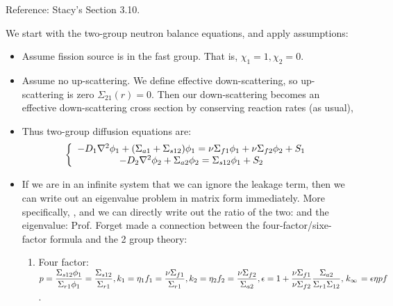 \documentclass{school-22.211-notes}
\date{April 4, 2012}
\begin{document}
\maketitle

\label{2g-finite-difference}
Reference: Stacy's Section 3.10. 

We start with the two-group neutron balance equations, and apply assumptions:
\begin{itemize}
\item Assume fission source is in the fast group. That is, $\chi_1 = 1, \chi_2 = 0$. 
\item Assume no up-scattering. We define effective down-scattering, so up-scattering is zero $\Sigma_{21}(r) = 0$. Then our down-scattering becomes an effective down-scattering cross section by conserving reaction rates (as usual), 

\item Thus two-group diffusion equations are: 
  \begin{align}
    \left\{ \begin{array}{c}
      - D_1 \nabla^2 \phi_1 + (\Sigma_{a1} + \Sigma_{s12}) \phi_1 = \nu \Sigma_{f1} \phi_1 + \nu \Sigma_{f2} \phi_2 + S_1  \\
      - D_2 \nabla^2 \phi_2 + \Sigma_{a2} \phi_2 = \Sigma_{s12} \phi_1 + S_2
    \end{array} \right. \label{two-group-eq}
  \end{align} 

\item If we are in an infinite system that we can ignore the leakage term, then we can write out an eigenvalue problem in matrix form immediately. More specifically, , and we can directly write out the ratio of the two: 
 and the eigenvalue: 
 Prof. Forget made a connection between the four-factor/sixe-factor formula and the 2 group theory: 
\begin{enumerate}
\item Four factor: $\displaystyle p = \frac{\Sigma_{s12} \phi_1}{\Sigma_{r1} \phi_1} = \frac{\Sigma_{s12}}{\Sigma_{r1}}, k_1 = \eta_1 f_1 = \frac{\nu \Sigma_{f1}}{\Sigma_{r1}}, k_2 = \eta_2 f_2 = \frac{\nu \Sigma_{f2}}{\Sigma_{a2}}, \epsilon = 1 + \frac{\nu \Sigma_{f1}}{\nu \Sigma_{f2}} \frac{\Sigma_{a2}}{\Sigma_{r1} \Sigma_{12}}, \left. k_{\infty} \right. = \epsilon \eta p f$. 


\end{enumerate}
\end{itemize}
\end{document}
